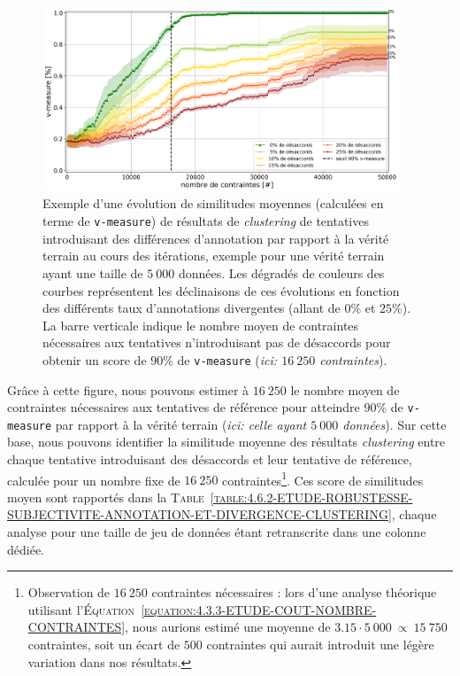 			\begin{figure}[!htb]
				\centering
				\includegraphics[width=0.95\textwidth]{figures/etude-robustesse-subjectivite-et-difference-5000}
				\caption{
					Exemple d'une évolution de similitudes moyennes (calculées en terme de \texttt{v-measure}) de résultats de \textit{clustering} de tentatives introduisant des différences d'annotation par rapport à la vérité terrain au cours des itérations, exemple pour une vérité terrain ayant une taille de $5~000$ données.
					Les dégradés de couleurs des courbes représentent les déclinaisons de ces évolutions en fonction des différents taux d'annotations divergentes (allant de $0$\% et $25$\%).
					La barre verticale indique le nombre moyen de contraintes nécessaires aux tentatives n'introduisant pas de désaccords pour obtenir un score de $90$\% de \texttt{v-measure} (\textit{ici: $16~250$ contraintes}).
				}
				\label{figure:4.6.2-ETUDE-ROBUSTESSE-SUBJECTIVITE-ANNOTATION-ET-DIVERGENCE-5000}
			\end{figure}
			
			Grâce à cette figure, nous pouvons estimer à $16~250$ le nombre moyen de contraintes nécessaires aux tentatives de référence pour atteindre $90$\% de \texttt{v-measure} par rapport à la vérité terrain (\textit{ici: celle ayant $5~000$ données}).
			Sur cette base, nous pouvons identifier la similitude moyenne des résultats \textit{clustering} entre chaque tentative introduisant des désaccords et leur tentative de référence, calculée pour un nombre fixe de $16~250$ contraintes\footnote{
				Observation de $16~250$ contraintes nécessaires : lors d'une analyse théorique utilisant l'\textsc{Équation~\ref{equation:4.3.3-ETUDE-COUT-NOMBRE-CONTRAINTES}}, nous aurions estimé une moyenne de $3.15 \cdot 5~000~\propto~15~750$ contraintes, soit un écart de $500$ contraintes qui aurait introduit une légère variation dans nos résultats.
			}.
			Ces score de similitudes moyen sont rapportés dans la \textsc{Table~\ref{table:4.6.2-ETUDE-ROBUSTESSE-SUBJECTIVITE-ANNOTATION-ET-DIVERGENCE-CLUSTERING}}, chaque analyse pour une taille de jeu de données étant retranscrite dans une colonne dédiée.
			
